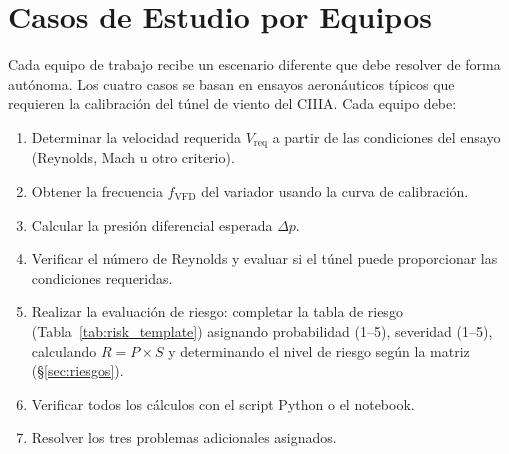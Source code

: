 \documentclass[12pt,a4paper]{article}
\begin{document}
\section{Casos de Estudio por Equipos}
\label{sec:equipos}

Cada equipo de trabajo recibe un escenario diferente que debe resolver de forma
autónoma.  Los cuatro casos se basan en ensayos aeronáuticos típicos que
requieren la calibración del túnel de viento del CIIIA. Cada equipo debe:
\begin{enumerate}
	\item Determinar la velocidad requerida $V_\mathrm{req}$ a partir de las
	      condiciones del ensayo (Reynolds, Mach u otro criterio).
	\item Obtener la frecuencia $f_\mathrm{VFD}$ del variador usando la curva
	      de calibración.
	\item Calcular la presión diferencial esperada $\Delta p$.
	\item Verificar el número de Reynolds y evaluar si el túnel puede proporcionar
	      las condiciones requeridas.
	\item Realizar la evaluación de riesgo: completar la tabla de riesgo
	      (Tabla~\ref{tab:risk_template}) asignando probabilidad (1--5),
	      severidad (1--5), calculando $R = P \times S$ y determinando el nivel
	      de riesgo según la matriz (§\ref{sec:riesgos}).
	\item Verificar todos los cálculos con el script Python o el notebook.
	\item Resolver los tres problemas adicionales asignados.
\end{enumerate}
\end{document}
